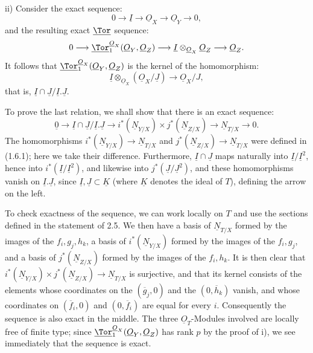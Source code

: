 ii) Consider the exact sequence:
\[
0\longrightarrow \underline{I}\longrightarrow \underline{O}_X\longrightarrow \underline{O}_Y\longrightarrow0,
\]
and the resulting exact \(\underline{\Tor}\) sequence:
\[
0\longrightarrow\underline{\Tor}_1^{\underline{O}_X}(\underline{O}_Y,\underline{O}_Z)
\longrightarrow \underline{I}\otimes_{\underline{O}_X}\underline{O}_Z
\longrightarrow \underline{O}_Z.
\]
It follows that \(\underline{\Tor}_1^{\underline{O}_X}(\underline{O}_Y,\underline{O}_Z)\) is the kernel of the homomorphism:
\[
\underline{I}\otimes_{\underline{O}_X}(\underline{O}_X/\underline{J})\longrightarrow \underline{O}_X/J,
\]
that is, \(\underline{I}\cap \underline{J}/\underline{I}.\underline{J}\).

To prove the last relation, we shall show that there is an exact sequence:
\[
\underline{0}\longrightarrow \underline{I}\cap \underline{J}/\underline{I}.\underline{J}
\longrightarrow i^*(\underline{N}_{Y/X})\times j^*(\underline{N}_{Z/X})
\longrightarrow \underline{N}_{T/X}\longrightarrow0.
\]
The homomorphisms \(i^*(\underline{N}_{Y/X})\to \underline{N}_{T/X}\) and \(j^*(\underline{N}_{Z/X})\to \underline{N}_{T/X}\) were defined in (1.6.1); here we take their difference. Furthermore, \(\underline{I}\cap \underline{J}\) maps naturally into \(\underline{I}/\underline{I}^2\), hence into \(i^*(\underline{I}/\underline{I}^2)\), and likewise into \(j^*(\underline{J}/\underline{J}^2)\), and these homomorphisms vanish on \(\underline{I}.\underline{J}\), since \(\underline{I},\underline{J}\subset \underline{K}\) (where \(\underline{K}\) denotes the ideal of \(T\)), defining the arrow on the left.

%
To check exactness of the sequence, we can work locally on \(T\) and use the sections defined in the statement of 2.5. We then have a basis of \(\underline{N}_{T/X}\) formed by the images of the \(f_i,g_j,h_k\), a basis of \(i^*(\underline{N}_{Y/X})\) formed by the images of the \(f_i,g_j\), and a basis of \(j^*(\underline{N}_{Z/X})\) formed by the images of the \(f_i,h_k\). It is then clear that \(i^*(\underline{N}_{Y/X})\times j^*(\underline{N}_{Z/X})\to \underline{N}_{T/X}\) is surjective, and that its kernel consists of the elements whose coordinates on the \((\overline g_j,0)\) and the \((0,\overline h_k)\) vanish, and whose coordinates on \((\overline f_i,0)\) and \((0,\overline f_i)\) are equal for every \(i\). Consequently the sequence is also exact in the middle. The three \(\underline{O}_T\)-Modules involved are locally free of finite type; since \(\underline{\Tor}_1^{\underline{O}_X}(\underline{O}_Y,\underline{O}_Z)\) has rank \(p\) by the proof of i), we see immediately that the sequence is exact.


